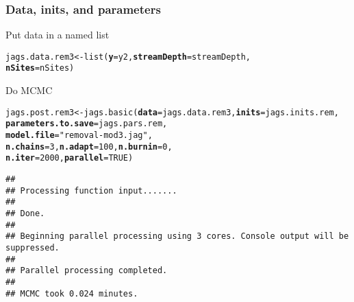 \documentclass[color=usenames,dvipsnames]{beamer}\usepackage[]{graphicx}\usepackage[]{color}
\makeatletter
\newcommand{\hlnum}[1]{\textcolor[rgb]{0.69,0.494,0}{#1}}%
\newcommand{\hlstr}[1]{\textcolor[rgb]{0.749,0.012,0.012}{#1}}%
\newcommand{\hlstd}[1]{\textcolor[rgb]{0,0,0}{#1}}%
\newcommand{\hlkwb}[1]{\textcolor[rgb]{0,0.341,0.682}{#1}}%
\newcommand{\hlkwc}[1]{\textcolor[rgb]{0,0,0}{\textbf{#1}}}%
\newcommand{\hlkwd}[1]{\textcolor[rgb]{0.004,0.004,0.506}{#1}}%
\newenvironment{kframe}{%
 \def\at@end@of@kframe{}%
 \ifinner\ifhmode%
  \def\at@end@of@kframe{\end{minipage}}%
  \begin{minipage}{\columnwidth}%
 \fi\fi%
 \def\FrameCommand##1{\hskip\@totalleftmargin \hskip-\fboxsep
 \colorbox{shadecolor}{##1}\hskip-\fboxsep
     \hskip-\linewidth \hskip-\@totalleftmargin \hskip\columnwidth}%
 \MakeFramed {\advance\hsize-\width
   \@totalleftmargin\z@ \linewidth\hsize
   \@setminipage}}%
 {\par\unskip\endMakeFramed%
 \at@end@of@kframe}
\newenvironment{knitrout}{}{} %
\makeatother
\begin{document}
\begin{frame}[fragile]
  \frametitle{Data, inits, and parameters}
  Put data in a named list
  \vspace{-12pt}
\begin{knitrout}\small
{}\color{fgcolor}\begin{kframe}
\begin{alltt}
\hlstd{jags.data.rem3} \hlkwb{<-} \hlkwd{list}\hlstd{(}\hlkwc{y}\hlstd{=y2,} \hlkwc{streamDepth}\hlstd{=streamDepth,}
                       \hlkwc{nSites}\hlstd{=nSites)}
\end{alltt}
\end{kframe}
\end{knitrout}
\vfill
  Do MCMC
\begin{knitrout}\scriptsize
{}\color{fgcolor}\begin{kframe}
\begin{alltt}
\hlstd{jags.post.rem3} \hlkwb{<-} \hlkwd{jags.basic}\hlstd{(}\hlkwc{data}\hlstd{=jags.data.rem3,} \hlkwc{inits}\hlstd{=jags.inits.rem,}
                             \hlkwc{parameters.to.save}\hlstd{=jags.pars.rem,}
                             \hlkwc{model.file}\hlstd{=}\hlstr{"removal-mod3.jag"}\hlstd{,}
                             \hlkwc{n.chains}\hlstd{=}\hlnum{3}\hlstd{,} \hlkwc{n.adapt}\hlstd{=}\hlnum{100}\hlstd{,} \hlkwc{n.burnin}\hlstd{=}\hlnum{0}\hlstd{,}
                             \hlkwc{n.iter}\hlstd{=}\hlnum{2000}\hlstd{,} \hlkwc{parallel}\hlstd{=}\hlnum{TRUE}\hlstd{)}
\end{alltt}
\begin{verbatim}
## 
## Processing function input....... 
## 
## Done. 
##  
## Beginning parallel processing using 3 cores. Console output will be suppressed.
## 
## Parallel processing completed.
## 
## MCMC took 0.024 minutes.
\end{verbatim}
\end{kframe}
\end{knitrout}
\end{frame}
\end{document}
